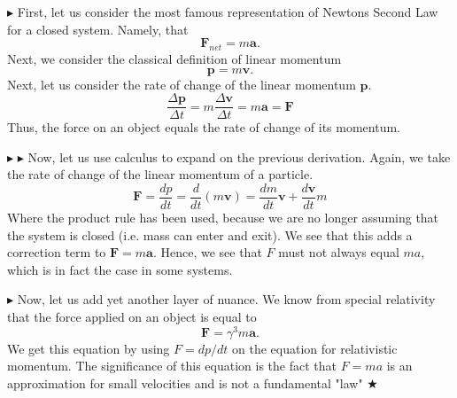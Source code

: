 \noindent \color{OrangeRed} $\blacktriangleright$ \color{black} First, let us consider the most famous representation of Newtons Second Law for a closed system. Namely, that 
\begin{equation}
    \mathbf{F}_{net}=m\mathbf{a}.
\end{equation}
\noindent Next, we consider the classical definition of linear momentum
\begin{equation}
    \mathbf{p} = m\mathbf{v}.
\end{equation}
\noindent Next, let us consider the rate of change of the linear momentum $\mathbf{p}$.
\begin{equation}
    \frac{\Delta \mathbf{p}}{\Delta t} = m \frac{\Delta \mathbf{v}}{\Delta t} = m\mathbf{a} = \mathbf{F}
\end{equation}
\noindent Thus,  the force on an object equals the rate of change of its momentum.

\noindent \color{PineGreen} $\blacktriangleright$ \color{Goldenrod} $\blacktriangleright$ \color{black} Now, let us use calculus to expand on the previous derivation. Again, we take the rate of change of the linear momentum of a particle.
\begin{equation}
    \mathbf{F} = \frac{dp}{dt} = \frac{d}{dt}(m\mathbf{v}) = \frac{dm}{dt}\mathbf{v} + \frac{d\mathbf{v}}{dt}m
\end{equation}
\noindent Where the product rule has been used, because we are no longer assuming that the system is closed (i.e. mass can enter and exit). We see that this adds a correction term to $\mathbf{F}=m\mathbf{a}$. Hence, we see that $F$ must not always equal $ma$, which is in fact the case in some systems.

\noindent \color{Orchid} $\blacktriangleright$ \color{black} Now, let us add yet another layer of nuance. We know from special relativity that the force applied on an object is equal to 
\begin{equation}
    \mathbf{F} = \gamma^3m\mathbf{a}.
\end{equation}
\noindent We get this equation by using $F=dp/dt$ on the equation for relativistic momentum. The significance of this equation is the fact that $F=ma$ is an approximation for small velocities and is not a fundamental "law"  $\bigstar$


